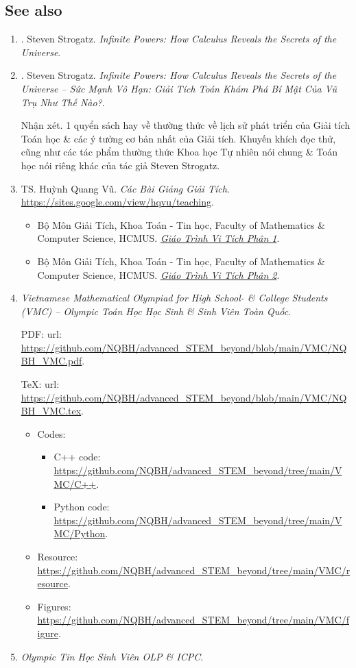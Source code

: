 \documentclass{article}
\begin{document}
\subsection{See also}

\begin{enumerate}
	\item \cite{Strogatz_infinite_power}. {\sc Steven Strogatz}. {\it Infinite Powers: How Calculus Reveals the Secrets of the Universe}.
	
	\item \cite{Strogatz_infinite_power_VN}. {\sc Steven Strogatz}. {\it Infinite Powers: How Calculus Reveals the Secrets of the Universe -- Sức Mạnh Vô Hạn: Giải Tích Toán Khám Phá Bí Mật Của Vũ Trụ Như Thế Nào?}.
	
	{\sf Nhận xét.} 1 quyển sách hay về thường thức về lịch sử phát triển của Giải tích Toán học \& các ý tưởng cơ bản nhất của Giải tích. Khuyến khích đọc thử, cũng như các tác phẩm thường thức Khoa học Tự nhiên nói chung \& Toán học nói riêng khác của tác giả {\sc Steven Strogatz}.
	\item TS. {\sc Huỳnh Quang Vũ}. {\it Các Bài Giảng Giải Tích}. \url{https://sites.google.com/view/hqvu/teaching}.
	\begin{itemize}
		\item Bộ Môn Giải Tích, Khoa Toán - Tin học, Faculty of Mathematics \& Computer Science, HCMUS. \href{https://drive.google.com/file/d/1NA1G0NSIVjnu_zG7e0JTnOvGfFqmuuVg/view}{\it Giáo Trình Vi Tích Phân 1}.
		\item Bộ Môn Giải Tích, Khoa Toán - Tin học, Faculty of Mathematics \& Computer Science, HCMUS. \href{https://drive.google.com/file/d/1Td7-zDZYFdop6f1IXvsPO0S4Cxc7ccd3/view}{\it Giáo Trình Vi Tích Phân 2}.
	\end{itemize}
	\item {\it Vietnamese Mathematical Olympiad for High School- \& College Students (VMC) -- Olympic Toán Học Học Sinh \& Sinh Viên Toàn Quốc}.
	
	PDF: {\sc url}: \url{https://github.com/NQBH/advanced_STEM_beyond/blob/main/VMC/NQBH_VMC.pdf}.
	
	\TeX: {\sc url}: \url{https://github.com/NQBH/advanced_STEM_beyond/blob/main/VMC/NQBH_VMC.tex}.
	\begin{itemize}
		\item Codes:
		\begin{itemize}
			\item C++ code: \url{https://github.com/NQBH/advanced_STEM_beyond/tree/main/VMC/C++}.
			\item Python code: \url{https://github.com/NQBH/advanced_STEM_beyond/tree/main/VMC/Python}.
		\end{itemize}
		\item Resource: \url{https://github.com/NQBH/advanced_STEM_beyond/tree/main/VMC/resource}.
		\item Figures: \url{https://github.com/NQBH/advanced_STEM_beyond/tree/main/VMC/figure}.
	\end{itemize}
	\item {\it Olympic Tin Học Sinh Viên OLP \& ICPC}.
	

\end{enumerate}
\end{document}
